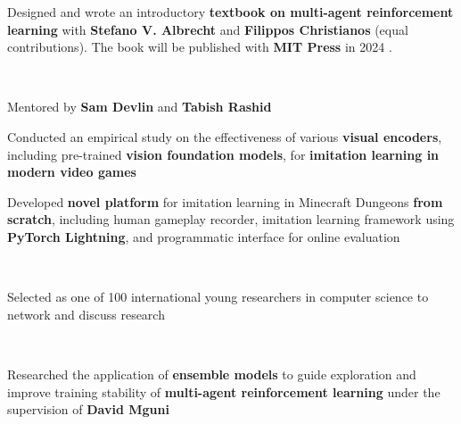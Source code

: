 \documentclass[]{lukas-cv-openfont}
\begin{document}
\noindent
{}
\vspace{-2em}
\begin{flushleft}
    Designed and wrote an introductory \textbf{textbook on multi-agent reinforcement learning} with \textbf{Stefano V. Albrecht} and \textbf{Filippos Christianos} (equal contributions). The book will be published with \textbf{MIT Press} in 2024 \cite{albrecht2024multi}.
\end{flushleft}
\sectionsep

\noindent
{}
\\
\begin{tightitemize}{1.7em}
    \item Mentored by \textbf{Sam Devlin} and \textbf{Tabish Rashid}
    \item Conducted an empirical study on the effectiveness of various \textbf{visual encoders}, including pre-trained \textbf{vision foundation models}, for \textbf{imitation learning in modern video games} \cite{schaefer2023visual}
    \item Developed \textbf{novel platform} for imitation learning in Minecraft Dungeons \textbf{from scratch}, including human gameplay recorder, imitation learning framework using \textbf{PyTorch Lightning}, and programmatic interface for online evaluation
\end{tightitemize}
\sectionsep

\noindent
{}
\\
\begin{tightitemize}{1.7em}
    \item Selected as one of 100 international young researchers in computer science to network and discuss research
\end{tightitemize}
\sectionsep

\noindent
{}
\\
\begin{tightitemize}{1.7em}
    \item Researched the application of \textbf{ensemble models} to guide exploration and improve training stability of \textbf{multi-agent reinforcement learning} under the supervision of \textbf{David Mguni} \cite{schaefer2023emax}
\end{tightitemize}
\sectionsep
\end{document}
